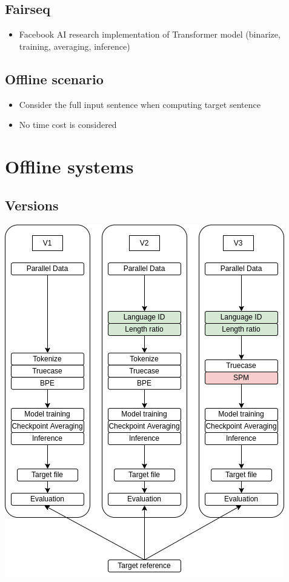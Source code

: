 \documentclass[landscape]{article}
\begin{document}
\subsection*{Fairseq}
\begin{itemize}
    \item Facebook AI research implementation of Transformer model (binarize, training, averaging, inference) 
\end{itemize}

\vspace*{10mm}
\subsection*{Offline scenario}
\begin{itemize}
    \item Consider the full input sentence when computing target sentence
    \item No time cost is considered 
\end{itemize}

\cp
\section*{Offline systems}
\subsection*{Versions}
\vspace*{10mm}
\centering
\includegraphics[scale=0.75]{../memoria/resources/pipelinev3.png}
\end{document}
